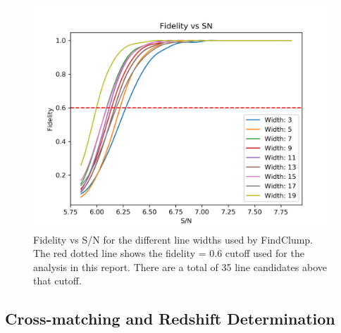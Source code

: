 \begin{figure}[!htbp]
\centering \includegraphics[width=120mm]{Fidelity_map.png}
\caption{Fidelity vs S/N for the different line widths used by FindClump. The red dotted line shows the fidelity = 0.6 cutoff used for the analysis in this report. There are a total of 35 line candidates above that cutoff.}
\label{fig:Fid_map}
\end{figure}


\subsection{Cross-matching and Redshift Determination}

